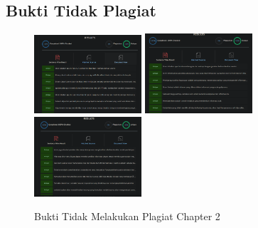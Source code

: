 \subsection{Bukti Tidak Plagiat}
\begin{figure}[H]
\centering
	\includegraphics[width=4cm]{figures/1174021/tugas2/buktiplagiat/1.PNG}
	\includegraphics[width=4cm]{figures/1174021/tugas2/buktiplagiat/2.PNG}
	\includegraphics[width=4cm]{figures/1174021/tugas2/buktiplagiat/3.PNG}
	\caption{Bukti Tidak Melakukan Plagiat Chapter 2}
\end{figure}

